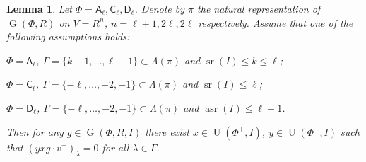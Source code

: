 \documentclass[11pt]{amsart}
\theoremstyle{plain}
\numberwithin{equation}{section}
\newtheorem{lemma}{Lemma}
\numberwithin{lemma}{section}
\theoremstyle{definition}
\theoremstyle{remark}
\DeclareMathOperator{\G}{G}
\DeclareMathOperator{\U}{U}
\DeclareMathOperator{\sr}{sr}
\DeclareMathOperator{\asr}{asr}
\newcommand{\rA}{\mathsf{A}}
\newcommand{\rC}{\mathsf{C}}
\newcommand{\rD}{\mathsf{D}}
\begin{document}
\begin{lemma} \label{lemma:uraction} 
Let $\Phi=\rA_\ell, \rC_\ell, \rD_\ell$. Denote by $\pi$ the natural representation of $\G(\Phi, R)$ on $V=R^n$, $n=\ell+1, 2\ell, 2\ell$ respectively.
Assume that one of the following assumptions holds:
\begin{lemlist}
 \item \label{item:uractionA} $\Phi=\rA_\ell$, $\Gamma=\{ k+1, \ldots, \ell+1\} \subset \Lambda(\pi)$ and $\sr(I)\leq k\leq \ell$;
 \item \label{item:uractionC} $\Phi=\rC_\ell$, $\Gamma=\{-\ell,\ldots, -2, -1\} \subset \Lambda(\pi)$ and $\sr(I)\leq \ell$;
 \item \label{item:uractionD} $\Phi=\rD_\ell$, $\Gamma=\{-\ell,\ldots, -2, -1\} \subset \Lambda(\pi)$ and $\asr(I)\leq \ell-1$. 
\end{lemlist}
Then for any $g\in \G(\Phi, R, I)$ there exist $x\in \U(\Phi^+, I)$, $y\in \U(\Phi^-, I)$ such that $(yxg \cdot v^+)_\lambda = 0$ for all $\lambda\in \Gamma$.
\end{lemma}
\end{document}
